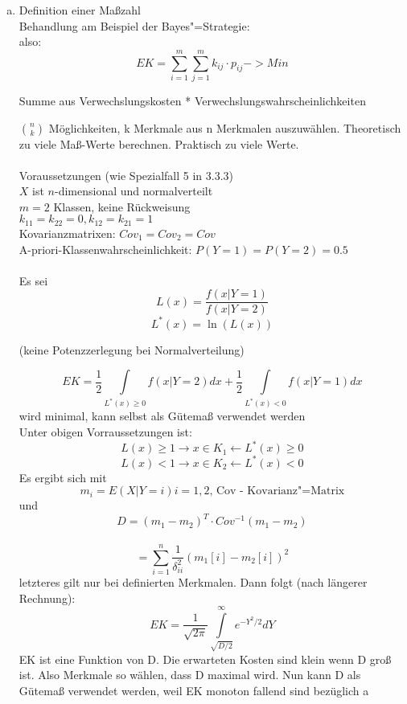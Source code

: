 \documentclass[a4paper,12pt]{scrreprt}
\begin{document}
\begin{enumerate}[a)]
 \item Definition einer Maßzahl\\
 Behandlung am Beispiel der Bayes"=Strategie:\\
 also:\\
 $$EK=\sum\limits_{i=1}^m\sum\limits^m_{j=1} k_{ij}\cdot p_{ij}-> Min$$
 \begin{center}
  Summe aus Verwechslungskosten * Verwechslungswahrscheinlichkeiten
 \end{center}

$\binom{n}{k}$ Möglichkeiten, k Merkmale aus n Merkmalen auszuwählen. Theoretisch zu viele Maß-Werte berechnen. Praktisch zu viele Werte.\\
\\
Voraussetzungen (wie Spezialfall 5 in 3.3.3)\\
$X$ ist $n$-dimensional und normalverteilt\\
$m=2$ Klassen, keine Rückweisung\\
$k_{11}=k_{22}=0, k_{12}=k_{21}=1$\\
Kovarianzmatrixen: $Cov_1=Cov_2=Cov$\\
A-priori-Klassenwahrscheinlichkeit: $P(Y=1)=P(Y=2)=0.5$\\
\\
Es sei $$L(x)=\frac{f(x|Y=1)}{f(x|Y=2)}$$
$$L^*(x)=\ln(L(x))$$
\begin{center}
 (keine Potenzzerlegung bei Normalverteilung)
\end{center}

$$EK=\frac{1}{2}\int\limits_{L^*(x)\ge 0}f(x|Y=2)dx+\frac{1}{2}\int\limits_{L^*(x)< 0}f(x|Y=1)dx$$
wird minimal, kann selbst als Gütemaß verwendet werden\\
Unter obigen Vorraussetzungen ist:
$$L(x) \ge 1 \to x\in K_1 \leftarrow L^*(x) \ge 0$$
$$L(x) < 1 \to x\in K_2 \leftarrow L^*(x) < 0 $$
Es ergibt sich mit\\
$$m_i=E(X|Y=i) i=1,2 \text{, Cov - Kovarianz"=Matrix}$$
und\\
$$D=(m_1-m_2)^T\cdot Cov^{-1}(m_1-m_2)$$\\
$$ = \sum_{i=1}^n \frac{1}{\delta_{ii}^2} (m_1[i]-m_2[i])^2 $$
letzteres gilt nur bei definierten Merkmalen. Dann folgt (nach längerer Rechnung):\\
$$EK=\frac{1}{\sqrt{2\pi}} \int\limits^\infty_{\sqrt{D/2}} e^{-Y^2/2}dY$$
EK ist eine Funktion von D. Die erwarteten Kosten sind klein wenn D groß ist.
Also Merkmale so wählen, dass D maximal wird.
Nun kann D als Gütemaß verwendet werden, weil EK monoton fallend sind bezüglich a


\end{enumerate}
\end{document}
